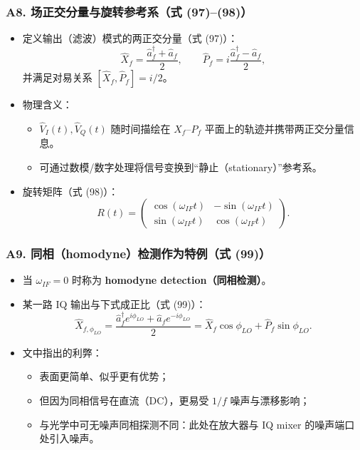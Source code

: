 \documentclass[12pt,a4paper,oneside]{ctexbook}
\providecommand{\tightlist}{%
  \setlength{\itemsep}{0pt}\setlength{\parskip}{0pt}}
\begin{document}
\subsubsection{A8. 场正交分量与旋转参考系（式
(97)--(98)）}\label{a8.-ux573aux6b63ux4ea4ux5206ux91cfux4e0eux65cbux8f6cux53c2ux8003ux7cfbux5f0f-9798}

\begin{itemize}
\tightlist
\item
  定义输出（滤波）模式的两正交分量（式 (97)）： \[
  \hat{X}_f=\frac{\hat{a}_f^\dagger+\hat{a}_f}{2},\qquad
  \hat{P}_f=i\frac{\hat{a}_f^\dagger-\hat{a}_f}{2},
  \] 并满足对易关系 \([\hat{X}_f,\hat{P}_f]=i/2\)。
\item
  物理含义：

  \begin{itemize}
  \tightlist
  \item
    \(\hat{V}_I(t),\hat{V}_Q(t)\) 随时间描绘在 \(X_f\text{–}P_f\)
    平面上的轨迹并携带两正交分量信息。
  \item
    可通过数模/数字处理将信号变换到``静止（stationary）''参考系。
  \end{itemize}
\item
  旋转矩阵（式 (98)）： \[
  R(t)=
  \begin{pmatrix}
  \cos(\omega_{IF}t) & -\sin(\omega_{IF}t)\\
  \sin(\omega_{IF}t) & \cos(\omega_{IF}t)
  \end{pmatrix}.
  \]
\end{itemize}


\subsubsection{A9. 同相（homodyne）检测作为特例（式
(99)）}\label{a9.-ux540cux76f8homodyneux68c0ux6d4bux4f5cux4e3aux7279ux4f8bux5f0f-99}

\begin{itemize}
\tightlist
\item
  当 \(\omega_{IF}=0\) 时称为 \textbf{homodyne detection（同相检测）}。
\item
  某一路 IQ 输出与下式成正比（式 (99)）： \[
  \hat{X}_{f,\phi_{LO}}=
  \frac{\hat{a}_f^\dagger e^{i\phi_{LO}}+\hat{a}_f e^{-i\phi_{LO}}}{2}
  =\hat{X}_f\cos\phi_{LO}+\hat{P}_f\sin\phi_{LO}.
  \]
\item
  文中指出的利弊：

  \begin{itemize}
  \tightlist
  \item
    表面更简单、似乎更有优势；
  \item
    但因为同相信号在直流（DC），更易受 \(1/f\) 噪声与漂移影响；
  \item
    与光学中可无噪声同相探测不同：此处在放大器与 IQ mixer
    的噪声端口处引入噪声。
  \end{itemize}
\end{itemize}
\end{document}
